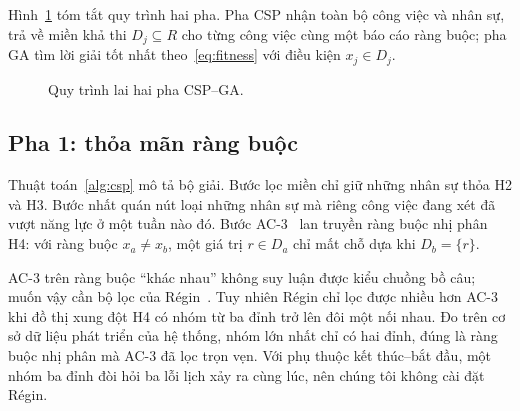 \documentclass{IEEEtran}
\begin{document}
Hình~\ref{fig:pipeline} tóm tắt quy trình hai pha. Pha CSP nhận toàn bộ công việc và nhân sự, trả về miền khả thi $D_j\subseteq R$ cho từng công việc cùng một báo cáo ràng buộc; pha GA tìm lời giải tốt nhất theo~\eqref{eq:fitness} với điều kiện $x_j\in D_j$.

\begin{figure}[t]
\centering
{}
\caption{Quy trình lai hai pha CSP--GA.}
\label{fig:pipeline}
\end{figure}

\subsection{Pha 1: thỏa mãn ràng buộc}

Thuật toán~\ref{alg:csp} mô tả bộ giải. Bước lọc miền chỉ giữ những nhân sự thỏa H2 và H3. Bước nhất quán nút loại những nhân sự mà riêng công việc đang xét đã vượt năng lực ở một tuần nào đó. Bước AC-3~\cite{mackworth1977} lan truyền ràng buộc nhị phân H4: với ràng buộc $x_a\ne x_b$, một giá trị $r\in D_a$ chỉ mất chỗ dựa khi $D_b=\{r\}$.

AC-3 trên ràng buộc ``khác nhau'' không suy luận được kiểu chuồng bồ câu; muốn vậy cần bộ lọc của Régin~\cite{regin1994}. Tuy nhiên Régin chỉ lọc được nhiều hơn AC-3 khi đồ thị xung đột H4 có nhóm từ ba đỉnh trở lên đôi một nối nhau. Đo trên cơ sở dữ liệu phát triển của hệ thống, nhóm lớn nhất chỉ có hai đỉnh, đúng là ràng buộc nhị phân mà AC-3 đã lọc trọn vẹn. Với phụ thuộc kết thúc--bắt đầu, một nhóm ba đỉnh đòi hỏi ba lỗi lịch xảy ra cùng lúc, nên chúng tôi không cài đặt Régin.
\end{document}
